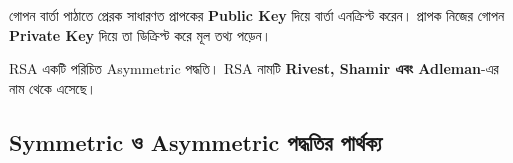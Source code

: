 গোপন বার্তা পাঠাতে প্রেরক সাধারণত প্রাপকের \textbf{Public Key} দিয়ে বার্তা এনক্রিপ্ট করেন। প্রাপক নিজের গোপন \textbf{Private Key} দিয়ে তা ডিক্রিপ্ট করে মূল তথ্য পড়েন।






RSA একটি পরিচিত Asymmetric পদ্ধতি। RSA নামটি
\textbf{Rivest, Shamir এবং Adleman}-এর নাম থেকে এসেছে।



\subsection{Symmetric ও Asymmetric পদ্ধতির পার্থক্য}

\begingroup
\small
\setlength{\tabcolsep}{4pt}
\renewcommand{\arraystretch}{1.10}


